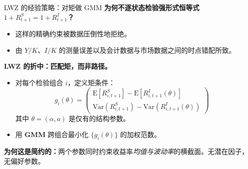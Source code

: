 \documentclass{beamer}
\begin{document}
\begin{frame}{LWZ 的经验策略：对矩做 GMM}
    \textbf{为何不逐状态检验强形式恒等式 $1+R^S_{t+1} = 1+R^I_{t+1}$？}
    \begin{itemize}
        \item 这样的精确约束被数据压倒性地拒绝。
        \item 由 $Y/K$、$I/K$ 的测量误差以及会计数据与市场数据之间的时点错配所致。
    \end{itemize}

    \vspace{0.2cm}
    \textbf{LWZ 的折中：匹配矩，而非路径。}
    \begin{itemize}
        \item 对每个检验组合 $i$，定义矩条件：
        \begin{equation*}
            g_i(\theta) = \begin{pmatrix} \mathrm{E}[R^S_{i,t+1}] - \mathrm{E}[R^I_{i,t+1}(\theta)] \\ \mathrm{Var}(R^S_{i,t+1}) - \mathrm{Var}(R^I_{i,t+1}(\theta)) \end{pmatrix}
        \end{equation*}
        其中 $\theta = (\alpha, a)$ 是仅有的结构参数。
        \item 用 \textbf{GMM} 跨组合最小化 $\{g_i(\theta)\}$ 的加权范数。
    \end{itemize}

    \vspace{0.1cm}
    \textbf{为何这是简约的：}两个参数同时约束收益率\textit{均值与波动率}的横截面。无潜在因子，无偏好参数。
\end{frame}
\end{document}
